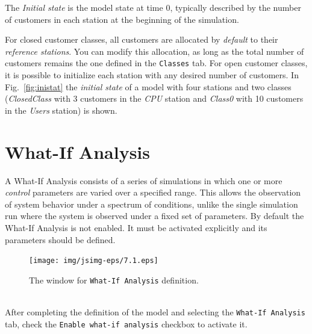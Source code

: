 {\large{}}

The \emph{Initial state} is the model state at time 0, typically
described by the number of customers in each station at the
beginning of the simulation.

For closed customer classes, all customers are allocated by
\emph{default} to their \emph{reference stations}. You can modify
this allocation, as long as the total number of customers remains
the one defined in the \texttt{Classes} tab. For open customer
classes, it is possible to initialize each station with any
desired number of customers. In Fig.~\ref{fig:inistat} the
\emph{initial state} of a model with four stations and two classes
(\emph{ClosedClass} with 3 customers in the \emph{CPU} station and
\emph{Class0} with 10 customers in the \emph{Users} station) is
shown.


\section{What-If Analysis}
\label{whaif}

A What-If Analysis consists of a series of simulations in which
one or more \emph{control} parameters are varied over a specified
range. This allows the observation of system behavior under a
spectrum of conditions, unlike the single simulation run where the
system is observed under a fixed set of parameters. By default the
What-If Analysis is not enabled. It must be activated explicitly
and its parameters should be defined.
\begin{figure}[hbt]
    \begin{center}
        \texttt{[image: img/jsimg-eps/7.1.eps]}
    \end{center}
    \caption{The window for \texttt{What-If Analysis} definition.}
    \label{fig:iniwhatif}
\end{figure}

\\ After
completing the definition of the model and selecting the
\texttt{What-If Analysis} tab, check the \texttt{Enable what-if
analysis} checkbox to activate it.

